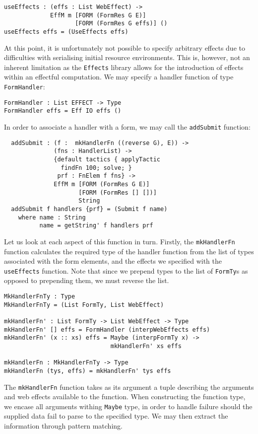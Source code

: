 \documentclass[preprint]{sigplanconf}
\begin{document}
\begin{verbatim}
useEffects : (effs : List WebEffect) ->
             EffM m [FORM (FormRes G E)] 
                    [FORM (FormRes G effs)] ()
useEffects effs = (UseEffects effs)
\end{verbatim}
At this point, it is unfortunately not possible to specify arbitrary effects due to difficulties with serialising initial resource environments. This is, however, not an inherent limitation as the \texttt{Effects} library allows for the introduction of effects within an effectful computation.
%
We may specify a handler function of type \texttt{FormHandler}:
\begin{verbatim}
FormHandler : List EFFECT -> Type
FormHandler effs = Eff IO effs ()
\end{verbatim}
In order to associate a handler with a form, we may call the \texttt{addSubmit} function:
%
\begin{verbatim}
  addSubmit : (f :  mkHandlerFn ((reverse G), E)) ->
              (fns : HandlerList) ->
              {default tactics { applyTactic 
                findFn 100; solve; }
               prf : FnElem f fns} ->
              EffM m [FORM (FormRes G E)]
                     [FORM (FormRes [] [])] 
                     String
  addSubmit f handlers {prf} = (Submit f name)
    where name : String
          name = getString' f handlers prf          
\end{verbatim}
%
Let us look at each aspect of this function in turn. Firstly, the \texttt{mkHandlerFn} function calculates the required type of the handler function from the list of types associated with the form elements, and the effects we specified with the \texttt{useEffects} function. Note that since we prepend types to the list of \texttt{FormTy}s as opposed to prepending them, we must reverse the list.
%
\begin{verbatim}
MkHandlerFnTy : Type
MkHandlerFnTy = (List FormTy, List WebEffect)

mkHandlerFn' : List FormTy -> List WebEffect -> Type
mkHandlerFn' [] effs = FormHandler (interpWebEffects effs) 
mkHandlerFn' (x :: xs) effs = Maybe (interpFormTy x) -> 
                              mkHandlerFn' xs effs 

mkHandlerFn : MkHandlerFnTy -> Type 
mkHandlerFn (tys, effs) = mkHandlerFn' tys effs 
\end{verbatim}
The \texttt{mkHandlerFn} function takes as its argument a tuple describing the arguments and web effects available to the function. When constructing the function type, we encase all arguments withing \texttt{Maybe} type, in order to handle failure should the supplied data fail to parse to the specified type. We may then extract the information through pattern matching.
\end{document}
